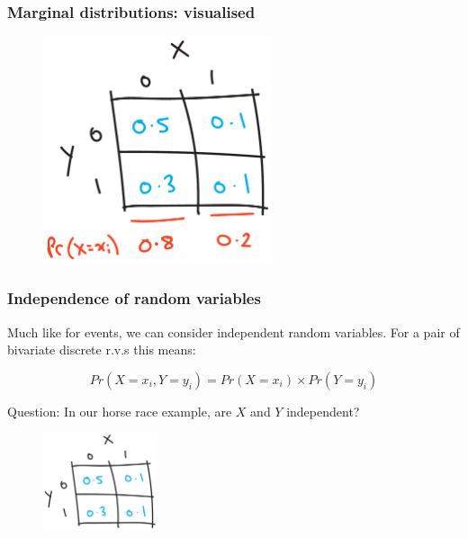 \documentclass{beamer}
\begin{document}
	\begin{frame}
		\frametitle{Marginal distributions: visualised}
		
			\begin{figure}[ht]
				\centerline{\includegraphics[width=0.6\textwidth]{./figures/horse_race_marginal.pdf}}
			\end{figure}
			
	\end{frame}
	
		\begin{frame}
			\frametitle{Independence of random variables}
			
			Much like for events, we can consider independent random variables. For a pair of bivariate discrete r.v.s this means:
			
			\begin{equation}
			Pr(X=x_i, Y=y_i) = Pr(X=x_i) \times Pr(Y=y_i)
			\end{equation}
			
			Question: In our horse race example, are $X$ and $Y$ independent?
			
			\begin{figure}[ht]
				\centerline{\includegraphics[width=0.3\textwidth]{./figures/horse_race_base.pdf}}
			\end{figure}
			
		\end{frame}
		
\end{document}
